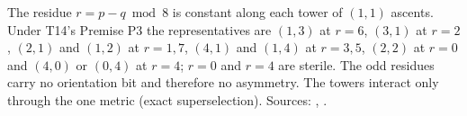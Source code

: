 The residue $r = p - q \bmod 8$ is constant along each tower of $(1,1)$ ascents. Under T14's Premise P3 the representatives are $(1,3)$ at $r = 6$, $(3,1)$ at $r = 2$, $(2,1)$ and $(1,2)$ at $r = 1, 7$, $(4,1)$ and $(1,4)$ at $r = 3, 5$, $(2,2)$ at $r = 0$ and $(4,0)$ or $(0,4)$ at $r = 4$; $r = 0$ and $r = 4$ are sterile. The odd residues carry no orientation bit and therefore no asymmetry. The towers interact only through the one metric (exact superselection). Sources: \cite[Prop.~3.1, Thm.~3.4, Thm.~3.10, Prop.~4.1]{ButlerT14}, \cite[Thm.~3.6]{ButlerT3}.

